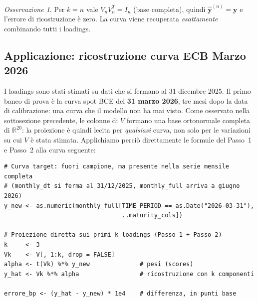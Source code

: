 \documentclass[11pt,a4paper]{article}
\theoremstyle{plain}
\theoremstyle{definition}
\theoremstyle{remark}
\newtheorem*{osservazione}{Osservazione}
\begin{document}
\begin{osservazione}
Per $k = n$ vale $V_n V_n^T = I_n$ (base completa), quindi
$\hat{\mathbf{y}}^{(n)} = \mathbf{y}$ e l'errore di ricostruzione è zero.
La curva viene recuperata \emph{esattamente} combinando tutti i loadings.
\end{osservazione}

\subsection{Applicazione: ricostruzione curva ECB Marzo 2026}
\label{sec:target-mar26}

I loadings sono stati stimati su dati che si fermano al 31 dicembre 2025.
Il primo banco di prova è la curva spot BCE del \textbf{31 marzo 2026}, tre
mesi dopo la data di calibrazione: una curva che il modello non ha mai visto.
Come osservato nella sottosezione precedente, le colonne di $V$ formano una
base ortonormale completa di $\mathbb{R}^{20}$: la proiezione è quindi
lecita per \emph{qualsiasi} curva, non solo per le variazioni su cui $V$ è
stata stimata. Applichiamo perciò direttamente le formule del Passo~1 e
Passo~2 alla curva seguente:

\begin{center}
\renewcommand{\arraystretch}{1.25}
\end{center}

\begin{codebox}
\begin{Verbatim}[fontsize=\small]
# Curva target: fuori campione, ma presente nella serie mensile completa
# (monthly_dt si ferma al 31/12/2025, monthly_full arriva a giugno 2026)
y_new <- as.numeric(monthly_full[TIME_PERIOD == as.Date("2026-03-31"),
                                 ..maturity_cols])

# Proiezione diretta sui primi k loadings (Passo 1 + Passo 2)
k     <- 3
Vk    <- V[, 1:k, drop = FALSE]
alpha <- t(Vk) %*% y_new              # pesi (scores)
y_hat <- Vk %*% alpha                 # ricostruzione con k componenti

errore_bp <- (y_hat - y_new) * 1e4    # differenza, in punti base
\end{Verbatim}
\end{codebox}
\end{document}
